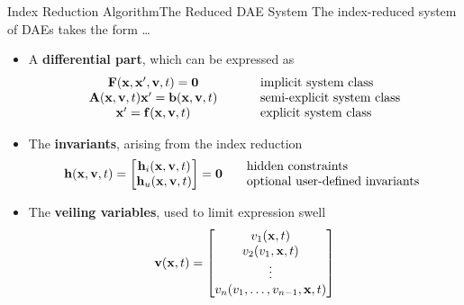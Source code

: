 \begin{frame}{Index Reduction Algorithm}{The Reduced \acs{DAE} System}
  The index-reduced system of \acsp{DAE} takes the form \dots
  \begin{itemize}[<+->]
    \item A \textbf{differential part}, which can be expressed as
    \begin{equation*}
      \begin{array}{ccl}
          \mathbf{F}(\mathbf{x}, \mathbf{x}^\prime, \mathbf{v}, t) = \mathbf{0} & \hspace{0.5cm} & \text{implicit  system class} \\
          \mathbf{A}(\mathbf{x}, \mathbf{v}, t) \mathbf{x}^\prime = \mathbf{b}(\mathbf{x}, \mathbf{v}, t) & \hspace{0.5cm} & \text{semi-explicit system class} \\
          \mathbf{x}^\prime = \mathbf{f}(\mathbf{x}, \mathbf{v}, t) & \hspace{0.5cm} & \text{explicit system class}
      \end{array}
    \end{equation*}
    \item The \textbf{invariants}, arising from the index reduction
    \begin{equation*}
      \mathbf{h}(\mathbf{x}, \mathbf{v}, t) = \begin{bmatrix}
          \mathbf{h}_{i}(\mathbf{x}, \mathbf{v}, t) \\
          \mathbf{h}_{u}(\mathbf{x}, \mathbf{v}, t)
      \end{bmatrix} = \mathbf{0} \hspace{0.5cm} \begin{array}{l}
        \text{hidden constraints} \\
        \text{optional user-defined invariants}
    \end{array}
    \end{equation*}
    \item The \textbf{veiling variables}, used to limit expression swell
    \begin{equation*}
        \mathbf{v}(\mathbf{x}, t) = \begin{bmatrix}
            v_{1}(\mathbf{x}, t) \\
            v_{2}(v_{1}, \mathbf{x}, t) \\
            \vdots \\
            v_{n}(v_{1}, \dots, v_{n-1}, \mathbf{x}, t)
        \end{bmatrix}
    \end{equation*}
  \end{itemize}
\end{frame}

